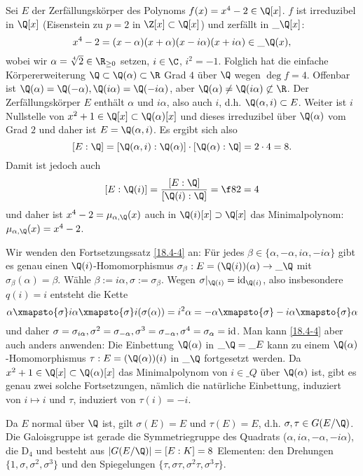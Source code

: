 \begin{ex} \label{19.5-5}
	Sei $E$ der Zerfällungskörper des Polynoms $f(x) = x^4 - 2 \in \Q[x]$.
	$f$ ist irreduzibel in $\Q[x]$ (Eisenstein zu $p = 2$ in $\Z[x] \subset \Q[x]$) und zerfällt in $\_\Q[x]$:
	\[
		x^4 - 2
		= (x-\alpha)(x + \alpha)(x - i\alpha)(x + i \alpha)
		\in \_\Q(x),
	\]
	wobei wir $\alpha = \sqrt[4]{2} \in \R_{\ge 0}$ setzen, $i \in \C$, $i^2 = -1$.
	Folglich hat die einfache Körpererweiterung $\Q \subset \Q(\alpha) \subset \R$ Grad $4$ über $\Q$ wegen $\deg f = 4$.
	Offenbar ist $\Q(\alpha) = \Q(-\alpha), \Q(i\alpha) = \Q(-i\alpha)$, aber $\Q(\alpha) \neq \Q(i\alpha) \not\subset \R$.
	Der Zerfällungskörper $E$ enthält $\alpha$ und $i \alpha$, also auch $i$, d.h. $\Q(\alpha, i) \subset E$.
	Weiter ist $i$ Nullstelle von $x^2 + 1 \in \Q[x] \subset \Q(\alpha)[x]$ und dieses irreduzibel über $\Q(\alpha)$ vom Grad $2$ und daher ist $E = \Q(\alpha, i)$.
	Es ergibt sich also
	\[
		[E : \Q] = [\Q(\alpha, i) : \Q(\alpha)] \cdot [\Q(\alpha) : \Q] = 2 \cdot 4 = 8.
	\]
	Damit ist jedoch auch
	\[
		[E : \Q(i)] = \dfrac{[E : \Q]}{[\Q(i) : \Q]} = \f 82 = 4
	\]
	und daher ist $x^4 - 2 = \mu_{\alpha, \Q}(x)$ auch in $\Q(i)[x] \supset \Q[x]$ das Minimalpolynom: $\mu_{\alpha, \Q}(x) = x^4 - 2$.

	Wir wenden den Fortsetzungssatz \ref{18.4-4} an:
	Für jedes $\beta \in \{\alpha, -\alpha, i \alpha, -i \alpha\}$ gibt es genau einen $\Q(i)$-Homomorphismus $\sigma_\beta: E = (\Q(i))(\alpha) \to \_{\Q}$ mit $\sigma_\beta(\alpha) = \beta$.
	Wähle $\beta := i \alpha, \sigma := \sigma_\beta$.
	Wegen $\sigma|_{\Q(i)} = \id_{\Q(i)}$, also insbesondere $q(i) = i$ entsteht die Kette
	\[
		\alpha
		\xmapsto{\sigma} i\alpha
		\xmapsto{\sigma} i(\sigma(\alpha)) = i^2 \alpha = -\alpha
		\xmapsto{\sigma} -i\alpha
		\xmapsto{\sigma} \alpha
	\]
	und daher $\sigma = \sigma_{i\alpha}, \sigma^2 = \sigma_{-\alpha}, \sigma^3 = \sigma_{-\alpha}, \sigma^4 = \sigma_\alpha = \operatorname{id}$.
	Man kann \ref{18.4-4} aber auch anders anwenden:
	Die Einbettung $\Q(\alpha)$ in $\_\Q = \_E$ kann zu einem $\Q(\alpha)$-Homomorphismus $\tau: E = (\Q(\alpha))(i)$ in $\_\Q$ fortgesetzt werden.
	Da $x^2 + 1 \in \Q[x] \subset \Q(\alpha)[x]$ das Minimalpolynom von $i \in \_Q$ über $\Q(\alpha)$ ist, gibt es genau zwei solche Fortsetzungen, nämlich die natürliche Einbettung, induziert von $i \mapsto i$ und $\tau$, induziert von $\tau(i) = -i$.

	Da $E$ normal über $\Q$ ist, gilt $\sigma(E) = E$ und $\tau(E) = E$, d.h. $\sigma, \tau \in G(E / \Q)$.
	Die Galoisgruppe ist gerade die Symmetriegruppe des Quadrats ($\alpha, i\alpha, -\alpha, -i\alpha$), die  $\mathrm D_4$ und besteht aus $|G(E / \Q)| = [E : K] = 8$ Elementen: den Drehungen $\{1, \sigma, \sigma^2, \sigma^3\}$ und den Spiegelungen $\{\tau, \sigma\tau, \sigma^2\tau, \sigma^3\tau\}$.


\end{ex}
